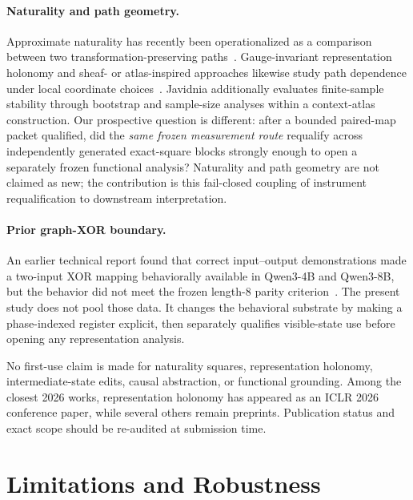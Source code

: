 \documentclass[10pt,a4paper]{article}
\begin{document}
\paragraph{Naturality and path geometry.}
Approximate naturality has recently been operationalized as a comparison between two transformation-preserving paths~\cite{kamitani2026}. Gauge-invariant representation holonomy and sheaf- or atlas-inspired approaches likewise study path dependence under local coordinate choices~\cite{sevetlidis2026,javidnia2026}. Javidnia additionally evaluates finite-sample stability through bootstrap and sample-size analyses within a context-atlas construction. Our prospective question is different: after a bounded paired-map packet qualified, did the \emph{same frozen measurement route} requalify across independently generated exact-square blocks strongly enough to open a separately frozen functional analysis? Naturality and path geometry are not claimed as new; the contribution is this fail-closed coupling of instrument requalification to downstream interpretation.

\paragraph{Prior graph-XOR boundary.}
An earlier technical report found that correct input--output demonstrations made a two-input XOR mapping behaviorally available in Qwen3-4B and Qwen3-8B, but the behavior did not meet the frozen length-8 parity criterion~\cite{kawasaki2026mapping}. The present study does not pool those data. It changes the behavioral substrate by making a phase-indexed register explicit, then separately qualifies visible-state use before opening any representation analysis.

No first-use claim is made for naturality squares, representation holonomy, intermediate-state edits, causal abstraction, or functional grounding. Among the closest 2026 works, representation holonomy has appeared as an ICLR 2026 conference paper, while several others remain preprints. Publication status and exact scope should be re-audited at submission time.

\section{Limitations and Robustness}
\label{sec:limitations}
\end{document}
